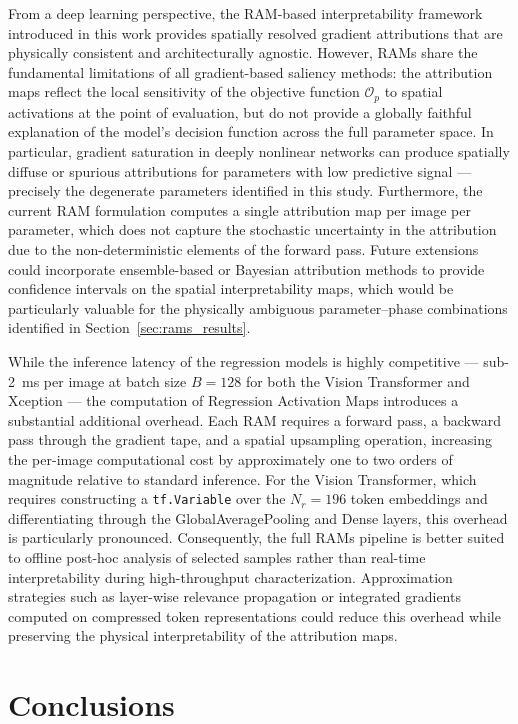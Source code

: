 \documentclass[a4paper,fleqn]{cas-sc}
\begin{document}
From a deep learning perspective, the RAM-based 
interpretability framework introduced in this work 
provides spatially resolved gradient attributions 
that are physically consistent and architecturally 
agnostic. However, RAMs share the fundamental 
limitations of all gradient-based saliency methods: 
the attribution maps reflect the local sensitivity 
of the objective function $\mathcal{O}_p$ to spatial 
activations at the point of evaluation, but do not 
provide a globally faithful explanation of the 
model's decision function across the full parameter 
space. In particular, gradient saturation in deeply 
nonlinear networks can produce spatially diffuse 
or spurious attributions for parameters with low 
predictive signal --- precisely the degenerate 
parameters identified in this study. Furthermore, 
the current RAM formulation computes a single 
attribution map per image per parameter, which 
does not capture the stochastic uncertainty in 
the attribution due to the non-deterministic 
elements of the forward pass. Future extensions 
could incorporate ensemble-based or Bayesian 
attribution methods to provide confidence intervals 
on the spatial interpretability maps, which would 
be particularly valuable for the physically 
ambiguous parameter--phase combinations identified 
in Section~\ref{sec:rams_results}.

While the inference latency of the regression models 
is highly competitive --- sub-2~ms per image at 
batch size $B=128$ for both the Vision Transformer 
and Xception --- the computation of Regression 
Activation Maps introduces a substantial additional 
overhead. Each RAM requires a forward pass, a 
backward pass through the gradient tape, and a 
spatial upsampling operation, increasing the 
per-image computational cost by approximately one 
to two orders of magnitude relative to standard 
inference. For the Vision Transformer, which 
requires constructing a \texttt{tf.Variable} over 
the $N_r = 196$ token embeddings and differentiating 
through the GlobalAveragePooling and Dense layers, 
this overhead is particularly pronounced. 
Consequently, the full RAMs pipeline is better 
suited to offline post-hoc analysis of selected 
samples rather than real-time interpretability 
during high-throughput characterization. 
Approximation strategies such as layer-wise 
relevance propagation or integrated gradients 
computed on compressed token representations could 
reduce this overhead while preserving the physical 
interpretability of the attribution maps.

\section{Conclusions}
\label{sec:conclusions}
\end{document}
